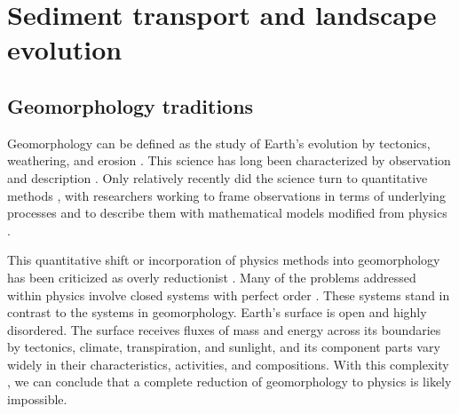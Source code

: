 
\chapter{Sediment transport and landscape evolution}
\label{ch:Introduction}

\section{Geomorphology traditions}
Geomorphology can be defined as the study of Earth's evolution by tectonics, weathering, and erosion \citep{Chorley1984}. 
This science has long been characterized by observation and description \citep{Gilbert1877, Tight1903, Hack1960}. Only relatively recently did the science turn to quantitative methods \citep{Bagnold1941, Strahler1952, Scheidegger1961, Leopold1962}, with researchers working to frame observations in terms of underlying processes and to describe them with mathematical models modified from physics \citep{Church2005,Roades1996,Chorley1965}.

This quantitative shift or incorporation of physics methods into geomorphology has been criticized as overly reductionist \citep{Slaymaker2020}.
Many of the problems addressed within physics involve closed systems with perfect order \citep{GoldSteinClassicalMechanics,SakuraiQM,JacksonElectrodynamics}. 
These systems stand in contrast to the systems in geomorphology. Earth's surface is open and highly disordered. The surface receives fluxes of mass and energy across its boundaries by tectonics, climate, transpiration, and sunlight, and its component parts vary widely in their characteristics, activities, and compositions. With this complexity \citep{Chorley1971}, we can conclude that a complete reduction of geomorphology to physics is likely impossible.

